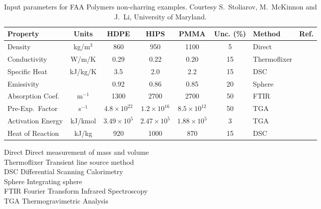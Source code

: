\begin{table}[h!]
\caption[FAA Polymer Properties]{Input parameters for FAA Polymers non-charring examples. Courtesy S.~Stoliarov, M.~McKinnon and J.~Li, University of Maryland.}
\begin{tabular}{|l|c|c|c|c|c|l|l|}
\hline 
Property                    & Units         & HDPE                  & HIPS                  & PMMA                  & Unc. (\%)  & Method                &  Ref.                    \\ \hline \hline
Density                     & kg/m$^3$      & 860                   & 950                   & 1100                  & 5     & Direct                &  \cite{Stoliarov:CF2009}  \\ \hline
Conductivity                & W/m/K         & 0.29                  & 0.22                  & 0.20                  & 15    & Thermoflixer          &  \cite{Stoliarov:CF2009}  \\ \hline
Specific Heat               & kJ/kg/K       & 3.5                   & 2.0                   & 2.2                   & 15    & DSC                   &  \cite{Stoliarov:PDS2008}  \\ \hline
Emissivity                  &               & 0.92                  & 0.86                  & 0.85                  & 20    & Sphere                &  \cite{Hallman:PES1974}  \\ \hline
Absorption Coef.            & m$^{-1}$      & 1300                  & 2700                  & 2700                  & 50    & FTIR                  &  \cite{Tsilingiris:ECM2003}  \\ \hline
Pre-Exp.~Factor             & s$^{-1}$      & $4.8 \times 10^{22}$  & $1.2 \times 10^{16}$  & $8.5 \times 10^{12}$  & 50    & TGA                   &  \cite{Stoliarov:CF2009}  \\ \hline
Activation Energy           & kJ/kmol       & $3.49 \times 10^{5}$  & $2.47 \times 10^{5}$  & $1.88 \times 10^{5}$  & 3     & TGA                   &  \cite{Stoliarov:CF2009}  \\ \hline
Heat of Reaction            & kJ/kg         & 920                   & 1000                  & 870                   & 15    & DSC                   &  \cite{Stoliarov:PDS2008}  \\ \hline
\end{tabular}
\label{FAA_Properties}
\end{table} 

\begin{tabbing}
Direct  \hspace{0.5in}     \= Direct measurement of mass and volume \\
Thermoflixer               \> Transient line source method \\
DSC                        \> Differential Scanning Calorimetry \\
Sphere                     \> Integrating sphere \\
FTIR                       \> Fourier Transform Infrared Spectroscopy \\
TGA                        \> Thermogravimetric Analysis
\end{tabbing}

